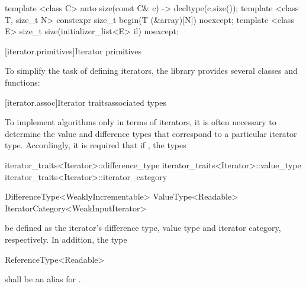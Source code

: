 \begin{addedblock}
\begin{codeblock}
  template <class C> auto size(const C& c) -> decltype(c.size());
  template <class T, size_t N> constexpr size_t begin(T (&array)[N]) noexcept;
  template <class E> size_t size(initializer_list<E> il) noexcept;
\end{codeblock}
\end{addedblock}
\begin{codeblock}
}
\end{codeblock}

[iterator.primitives]{Iterator primitives}

\pnum
To simplify the task of defining iterators, the library provides
several classes and functions:

[iterator.assoc]{Iterator \textcolor{remclr}{traits}\textcolor{addclr}{associated types}}

\pnum
To implement algorithms only in terms of iterators, it is often necessary to
determine the value and
difference types that correspond to a particular iterator type.
Accordingly, it is required that if
, the types

\begin{removedblock}
\begin{codeblock}
iterator_traits<Iterator>::difference_type
iterator_traits<Iterator>::value_type
iterator_traits<Iterator>::iterator_category
\end{codeblock}
\end{removedblock}
\begin{addedblock}
\begin{codeblock}
DifferenceType<WeaklyIncrementable>
ValueType<Readable>
IteratorCategory<WeakInputIterator>
\end{codeblock}
\end{addedblock}

be defined as the iterator's difference type, value type and iterator category, respectively.
In addition, the type

\begin{addedblock}
\begin{codeblock}
ReferenceType<Readable>
\end{codeblock}

shall be an alias for .
\end{addedblock}

